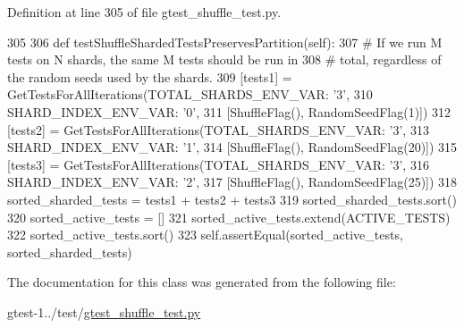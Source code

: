 \-Definition at line 305 of file gtest\-\_\-shuffle\-\_\-test.\-py.


\begin{DoxyCode}
305 
306   def testShuffleShardedTestsPreservesPartition(self):
307     # If we run M tests on N shards, the same M tests should be run in
308     # total, regardless of the random seeds used by the shards.
309     [tests1] = GetTestsForAllIterations({TOTAL_SHARDS_ENV_VAR: '3',
310                                          SHARD_INDEX_ENV_VAR: '0'},
311                                         [ShuffleFlag(), RandomSeedFlag(1)])
312     [tests2] = GetTestsForAllIterations({TOTAL_SHARDS_ENV_VAR: '3',
313                                          SHARD_INDEX_ENV_VAR: '1'},
314                                         [ShuffleFlag(), RandomSeedFlag(20)])
315     [tests3] = GetTestsForAllIterations({TOTAL_SHARDS_ENV_VAR: '3',
316                                          SHARD_INDEX_ENV_VAR: '2'},
317                                         [ShuffleFlag(), RandomSeedFlag(25)])
318     sorted_sharded_tests = tests1 + tests2 + tests3
319     sorted_sharded_tests.sort()
320     sorted_active_tests = []
321     sorted_active_tests.extend(ACTIVE_TESTS)
322     sorted_active_tests.sort()
323     self.assertEqual(sorted_active_tests, sorted_sharded_tests)

\end{DoxyCode}


\-The documentation for this class was generated from the following file\-:\begin{DoxyCompactItemize}
\item 
gtest-\/1../test/\hyperlink{gtest__shuffle__test_8py}{gtest\-\_\-shuffle\-\_\-test.\-py}\end{DoxyCompactItemize}

